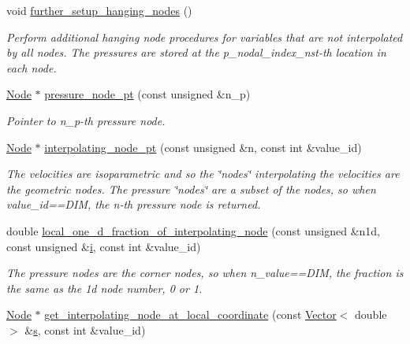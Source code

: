 \begin{DoxyCompactItemize}
void \hyperlink{classoomph_1_1RefineableGeneralisedNewtonianQTaylorHoodElement_a1b26f16b86c5d72d9da4bf2c2b7741d0}{further\+\_\+setup\+\_\+hanging\+\_\+nodes} ()
\begin{DoxyCompactList}\small\item\em Perform additional hanging node procedures for variables that are not interpolated by all nodes. The pressures are stored at the p\+\_\+nodal\+\_\+index\+\_\+nst-\/th location in each node. \end{DoxyCompactList}\item 
\hyperlink{classoomph_1_1Node}{Node} $\ast$ \hyperlink{classoomph_1_1RefineableGeneralisedNewtonianQTaylorHoodElement_a464263e4f629fd72b8b97329eb0a2194}{pressure\+\_\+node\+\_\+pt} (const unsigned \&n\+\_\+p)
\begin{DoxyCompactList}\small\item\em Pointer to n\+\_\+p-\/th pressure node. \end{DoxyCompactList}\item 
\hyperlink{classoomph_1_1Node}{Node} $\ast$ \hyperlink{classoomph_1_1RefineableGeneralisedNewtonianQTaylorHoodElement_a698043f19ce65cb9a8cc85bc816ccd7d}{interpolating\+\_\+node\+\_\+pt} (const unsigned \&n, const int \&value\+\_\+id)
\begin{DoxyCompactList}\small\item\em The velocities are isoparametric and so the \char`\"{}nodes\char`\"{} interpolating the velocities are the geometric nodes. The pressure \char`\"{}nodes\char`\"{} are a subset of the nodes, so when value\+\_\+id==D\+IM, the n-\/th pressure node is returned. \end{DoxyCompactList}\item 
double \hyperlink{classoomph_1_1RefineableGeneralisedNewtonianQTaylorHoodElement_ae5eda68a83a1e61082f813c7500b698c}{local\+\_\+one\+\_\+d\+\_\+fraction\+\_\+of\+\_\+interpolating\+\_\+node} (const unsigned \&n1d, const unsigned \&\hyperlink{cfortran_8h_adb50e893b86b3e55e751a42eab3cba82}{i}, const int \&value\+\_\+id)
\begin{DoxyCompactList}\small\item\em The pressure nodes are the corner nodes, so when n\+\_\+value==D\+IM, the fraction is the same as the 1d node number, 0 or 1. \end{DoxyCompactList}\item 
\hyperlink{classoomph_1_1Node}{Node} $\ast$ \hyperlink{classoomph_1_1RefineableGeneralisedNewtonianQTaylorHoodElement_a0766216e91d89a8459e650b6b5a72f2c}{get\+\_\+interpolating\+\_\+node\+\_\+at\+\_\+local\+\_\+coordinate} (const \hyperlink{classoomph_1_1Vector}{Vector}$<$ double $>$ \&\hyperlink{cfortran_8h_ab7123126e4885ef647dd9c6e3807a21c}{s}, const int \&value\+\_\+id)

\end{DoxyCompactItemize}
